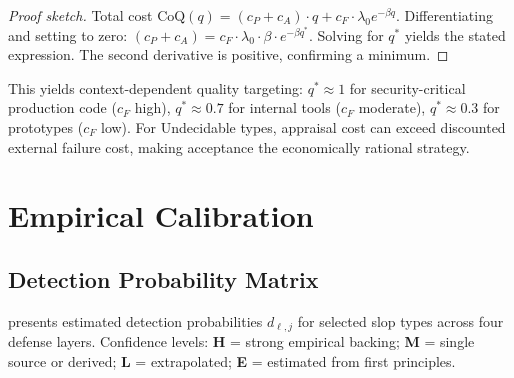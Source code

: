 \documentclass[11pt, a4paper, logo, copyright]{googledeepmind}
\begin{document}
\begin{proof}[Proof sketch]
Total cost $\text{CoQ}(q) = (c_P + c_A) \cdot q + c_F \cdot \lambda_0 e^{-\beta q}$. Differentiating and setting to zero: $(c_P + c_A) = c_F \cdot \lambda_0 \cdot \beta \cdot e^{-\beta q^*}$. Solving for $q^*$ yields the stated expression. The second derivative is positive, confirming a minimum.
\end{proof}

This yields context-dependent quality targeting: $q^* \approx 1$ for security-critical production code ($c_F$ high), $q^* \approx 0.7$ for internal tools ($c_F$ moderate), $q^* \approx 0.3$ for prototypes ($c_F$ low). For Undecidable types, appraisal cost can exceed discounted external failure cost, making acceptance the economically rational strategy.


\section{Empirical Calibration}
\label{sec:empirical}

\subsection{Detection Probability Matrix}

 presents estimated detection probabilities $d_{\ell,j}$ for selected slop types across four defense layers. Confidence levels: \textbf{H} = strong empirical backing; \textbf{M} = single source or derived; \textbf{L} = extrapolated; \textbf{E} = estimated from first principles.
\end{document}
